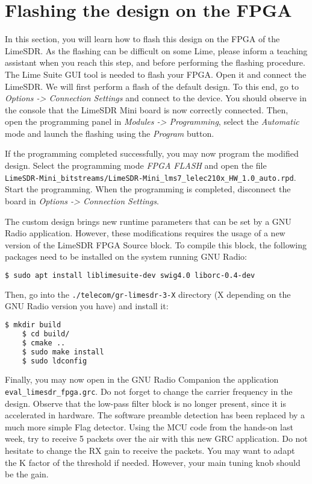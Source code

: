 


\section{Flashing the design on the FPGA}

 In this section, you will learn how to flash this design on the FPGA of the LimeSDR. As the flashing can be difficult on some Lime, please inform a teaching assistant when you reach this step, and before performing the flashing procedure. The Lime Suite GUI tool is needed to flash your FPGA. Open it and connect the LimeSDR. We will first perform a flash of the default design. To this end, go to \textit{Options -> Connection Settings} and connect to the device. You should observe in the console that the LimeSDR Mini board is now correctly connected. Then, open the programming panel in \textit{Modules -> Programming}, select the \textit{Automatic} mode and launch the flashing using the \textit{Program} button.

If the programming completed successfully, you may now program the modified design. Select the programming mode \textit{FPGA FLASH} and open the file \\ \texttt{LimeSDR-Mini\_bitstreams/LimeSDR-Mini\_lms7\_lelec210x\_HW\_1.0\_auto.rpd}. Start the programming. When the programming is completed, disconnect the board in \textit{Options -> Connection Settings}.

The custom design brings new runtime parameters that can be set by a GNU Radio application. However, these modifications requires the usage of a new version of the LimeSDR FPGA Source block. To compile this block, the following packages need to be installed on the system running GNU Radio:
\begin{lstlisting}[language=bash, keepspaces=true, columns=fullflexible]
    $ sudo apt install liblimesuite-dev swig4.0 liborc-0.4-dev
\end{lstlisting}
Then, go into the \texttt{./telecom/gr-limesdr-3-X} directory (X depending on the GNU Radio version you have) and install it:
\begin{lstlisting}[language=bash, keepspaces=true, columns=fullflexible]
    $ mkdir build
    $ cd build/
    $ cmake ..
    $ sudo make install
    $ sudo ldconfig
\end{lstlisting}

Finally, you may now open in the GNU Radio Companion the application \texttt{eval\_limesdr\_fpga.grc}. Do not forget to change the carrier frequency in the design. Observe that the low-pass filter block is no longer present, since it is accelerated in hardware. The software preamble detection has been replaced by a much more simple Flag detector. Using the MCU code from the hands-on last week, try to receive 5 packets over the air with this new GRC application. Do not hesitate to change the RX gain to receive the packets. You may want to adapt the K factor of the threshold if needed. However, your main tuning knob should be the gain.
